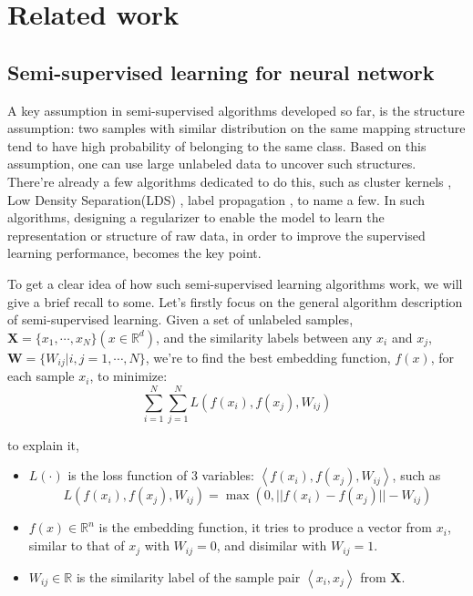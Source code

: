 \documentclass[3p,times,procedia]{elsarticle}
\begin{document}
\section{Related work}

\subsection{Semi-supervised learning for
neural network}
A key assumption in semi-supervised 
algorithms developed so far, is the 
structure assumption: two samples with 
similar distribution on the same mapping 
structure tend to have high probability 
of belonging to the same class. Based on 
this assumption, one can use large 
unlabeled data to uncover such 
structures. There're already a few 
algorithms dedicated to do this,
such as cluster kernels
\cite{chapelle2003cluster},
Low Density Separation(LDS)
\cite{chapelle2005semi},
label propagation
\cite{zhu2002learning},
to name a few.
In such algorithms, designing a regularizer
to enable the model to learn the representation
or structure of raw data, in order to improve
the supervised learning performance, becomes
the key point.

To get a clear idea of how such semi-supervised
learning algorithms work, we will give a brief 
recall to some.
Let's firstly focus on the general algorithm
description of semi-supervised learning.
Given a set of unlabeled samples,
$\mathbf{X}=\{x_1,\cdots,x_N\}
(x\in\mathbb{R}^d)$,
and the similarity labels between any
$x_i$ and $x_j$,
$\mathbf{W}=\{W_{ij}|i,j=1,\cdots,N\}$,
we're to find the best embedding function, 
$f(x)$, for each sample $x_i$, to minimize:
\begin{equation}
\sum^{N}_{i=1}\sum^{N}_{j=1}L(f(x_i),f(x_j),W_{ij})
\label{eq:1}
\end{equation}

to explain it,
\begin{itemize}[]
\item $L(\cdot)$ is the loss function of 3 variables: 
$\left<f(x_i),f(x_j),W_{ij}\right>$, 
such as 
$$L(f(x_i),f(x_j),W_{ij}) = 
\max(0,||f(x_i)-f(x_j)||-W_{ij})$$
\item $f(x)\in\mathbb{R}^n$ is the embedding function, it tries to produce
a vector from $x_i$, similar to that of $x_j$ with $W_{ij}=0$,
and disimilar with $W_{ij}=1$.
\item $W_{ij}\in \mathbb{R}$ is the similarity label of the sample pair
$\left<x_i,x_j\right>$ from $\mathbf{X}$.
\end{itemize}
\end{document}

